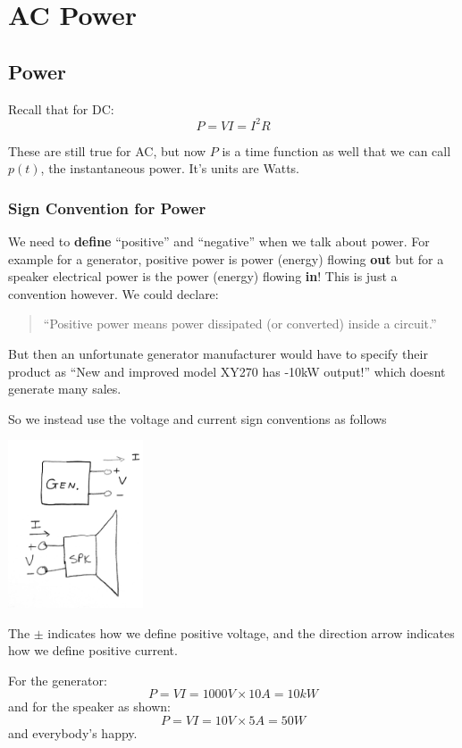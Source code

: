 
\chapter{AC Power}
\section{Power}

Recall that for DC:
\[
P = VI = I^2 R
\]

These are still true for AC, but now $P$ is a time function as well
that we can call $p(t)$, the instantaneous power.  It's units
are  Watts.

\subsection{Sign Convention for Power}

We need to {\bf define} ``positive'' and ``negative'' when we talk about
power. For example for a generator, positive power is power (energy) flowing
{\bf out} but for a speaker electrical power is the power (energy) flowing
{\bf in}!     This is just a convention however.  We could declare:

\begin{quotation} ``Positive power means power dissipated (or converted) inside
a circuit.'' \end{quotation}

But then an unfortunate generator manufacturer would have to specify their
product as ``New
and improved model XY270 has -10kW output!'' which doesnt generate many sales.

So we instead use the voltage and current sign conventions as follows

\includegraphics[width=0.3\textwidth]{figsChapt03/IE47318.png}

The $\pm$ indicates how we define positive voltage, and the direction arrow indicates
how we define positive current.

For the generator:
\[
P = VI = 1000V\times 10A = 10kW
\]
and for the speaker as shown:
\[
P = VI = 10V\times5A  =50W
\]
and everybody's happy.








